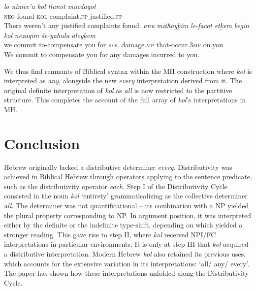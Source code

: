 \documentclass[output=paper]{langsci/langscibook}
\begin{document}
\ea%
    \label{ex:doron:60}
    \ea
    \gll \textit{lo}     \textit{nimce’u}     \textit{kol}    \textit{tlunot}              \textit{mucdaqot}\\
         \textsc{neg} found         \textsc{kol}  complaint.\textsc{fp}  justified.\textsc{fp} \\
    \glt There weren’t any justified complaints found.   
    \ex  
    \gll \textit{anu} \textit{mitħayḇim}  \textit{le-facot}            \textit{etḵem}  \textit{begin}  \textit{kol}   \textit{nezaqim}        \textit{še-yaħulu}            \textit{aleyḵem}   \\
         we  commit       to-compensate you       for      \textsc{kol}  damage.\textsc{mp}  that-occur.3\textsc{mp}  on.you \\
    \glt We commit to compensate you for any damages incurred to you.    
    \z
\z

We thus find remnants of Biblical syntax within the MH  construction where  \textit{kol} is interpreted as \textit{any}, alongside the new \textit{every} interpretation derived from it. The original definite interpretation of \textit{kol} as \textit{all} is now restricted to the partitive  structure. This completes the account of the full array of \textit{kol}’s interpretations in MH.

\section{Conclusion}%
Hebrew originally lacked a distributive determiner \textit{every}. Distributivity  \linebreak was achieved in Biblical Hebrew through operators applying to the sentence predicate, such as the distributivity operator \textit{each.} Step I of the Distributivity Cycle consisted in the noun \textit{kol} ‘entirety’ grammaticalizing as the collective determiner \textit{all}. The determiner was not quantificational – its combination with a NP yielded the plural property corresponding to NP. In argument position, it was interpreted either by the definite or the indefinite type-shift, depending on which yielded a stronger reading. This gave rise to step II, where \textit{kol} received NPI/FC interpretations in particular environments. It is only at step III that \textit{kol} acquired a distributive interpretation. Modern Hebrew \textit{kol} also retained its previous uses, which accounts for the extensive variation in its interpretations: ‘all/ any/ every’. The paper has shown how these interpretations unfolded along the Distributivity Cycle.
\end{document}
